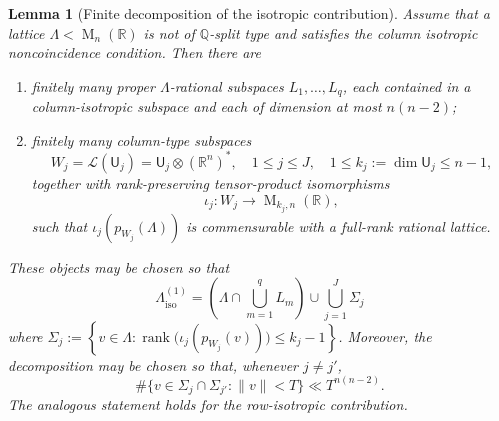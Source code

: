\documentclass[reqno,11pt]{amsart}
\numberwithin{equation}{section}
\newtheorem{lemma}[theorem]{Lemma}
\theoremstyle{definition}
\theoremstyle{remark}
\newcommand{\op}{\operatorname}
\newcommand{\rank}{\op{rank}}
\newcommand{\br}{\mathbb R}
\newcommand{\M}{\op{M}}
\begin{document}
\begin{lemma}[Finite decomposition of the isotropic contribution]
\label{lem:finite-isotropic-piece-decomposition}
Assume that a lattice $\Lambda<\M_n(\br)$ is not of $\mathbb Q$-split type and satisfies the column
isotropic noncoincidence condition. Then there are
\begin{enumerate}[label=\textnormal{(\roman*)}]
\item finitely many proper $\Lambda$-rational subspaces
$L_1,\ldots,L_q$, each contained in a column-isotropic subspace and each of
dimension at most $n(n-2)$; 
\item finitely many column-type subspaces
$$
W_j=\mathcal L(\mathsf U_j)=\mathsf U_j\otimes(\mathbb R^n)^*,
\quad 1\le j\le J,
\quad
1\le k_j:=\dim \mathsf U_j\le n-1,
$$
together with rank-preserving tensor-product isomorphisms
$$
\iota_j:W_j\to\M_{k_j,n}(\mathbb R),
$$
such that $\iota_j(p_{W_j}(\Lambda))$ is commensurable with a full-rank
rational lattice.
\end{enumerate}
These objects may be chosen so that
\begin{equation}\label{eq:finite-column-decomposition}
\Lambda_{\operatorname{iso}}^{(1)}
=
\left(\Lambda\cap\bigcup_{m=1}^qL_m\right)
\cup
\bigcup_{j=1}^J\Sigma_j
\end{equation}
where
$
\Sigma_j
:=
\left\{
v\in\Lambda:
\rank\bigl(\iota_j(p_{W_j}(v))\bigr)\le k_j-1
\right\}$.
Moreover, the decomposition may be chosen so that, whenever $j\ne j'$,
\begin{equation}\label{eq:column-piece-overlap}
\#\{v\in\Sigma_j\cap\Sigma_{j'}:\|v\|< T\}
\ll
T^{n(n-2)}.
\end{equation}
The analogous statement holds for the row-isotropic contribution.
\end{lemma}
\end{document}
